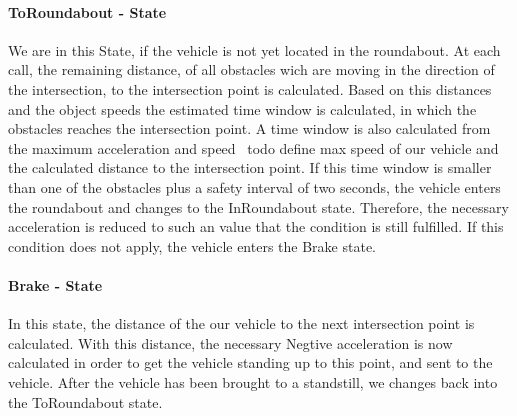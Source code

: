 \documentclass[11pt,oneside,openright]{mpreport}
\begin{document}
\paragraph{ToRoundabout - State}
We are in this State, if the vehicle is not yet located in the roundabout. At each call, the remaining distance,
of all obstacles wich are moving in the direction of the intersection, to the intersection point is calculated. 
Based on this distances and the object speeds the estimated time window is calculated, in which the obstacles reaches the intersection point.
A time window is also calculated from the maximum acceleration and speed \ todo {define max speed} of our vehicle and the calculated distance to the intersection point.
If this time window is smaller than one of the obstacles plus a safety interval of two seconds, the vehicle enters the roundabout and changes to the InRoundabout state.
Therefore, the necessary acceleration is reduced to such an value that the condition is still fulfilled. If this condition does not apply, the vehicle enters the Brake state.

\paragraph{Brake - State}
In this state, the distance of the our vehicle to the next intersection point is calculated.
With this distance, the necessary Negtive acceleration is now calculated in order to get the vehicle standing up to this point,
and sent to the vehicle. After the vehicle has been brought to a standstill, we changes back into the ToRoundabout state.
\end{document}
